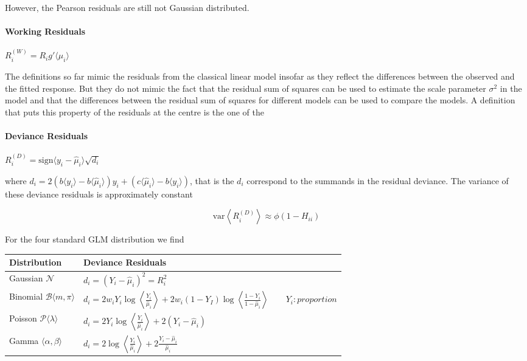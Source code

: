 \documentclass[11pt]{article}
\begin{document}
However, the Pearson residuals are still not Gaussian distributed.

\paragraph{Working Residuals} $R_i^{(W)} = R_i g'\langle \mu_i\rangle$

The definitions so far mimic the residuals from the classical linear model insofar as they reflect the differences between the observed and the fitted response. But they do not mimic the fact that the residual sum of squares can be used to estimate the scale parameter $\sigma^2$ in the model and that the differences between the residual sum of squares for different models can be used to compare the models. A definition that puts this property of the residuals at the centre is the one of the
\paragraph{Deviance Residuals} $R_i^{(D)} = \text{sign}\langle y_i - \widehat{\mu}_i \rangle \sqrt{d_i}$

where $d_i = 2\left(b\langle y_i \rangle - b\langle \widehat{\mu}_i \rangle \right) y_i + \left(c\langle \widehat{\mu}_i \rangle - b\langle y_i \rangle \right)$, that is the $d_i$ correspond to the summands in the residual deviance. The variance of these deviance residuals is approximately constant

\begin{equation*}
	\text{var}\left\langle R_i^{(D)} \right\rangle \approx \phi (1 - H_{ii})
\end{equation*}

\noindent
For the four standard GLM distribution we find

\vspace{1em}
\noindent
\begin{minipage}{\textwidth}
	\renewcommand{\arraystretch}{2}
	\centering
	\begin{tabularx}{\textwidth}{|p{4cm}|| X |}
		\hline
		\textbf{Distribution} & Deviance Residuals \\
		\hline
		Gaussian $\mathcal{N}$ & $d_i = \left( Y_i - \widehat{\mu}_i \right)^2 = R_i^2 $\\
		Binomial $\mathcal{B}\langle m, \pi \rangle$ & $ d_i = 2 w_i Y_i \log \left\langle \frac{Y_i}{\widehat{\mu}_i} \right\rangle + 2 w_i (1 - Y_I) \log\left\langle \frac{1 - Y_i}{1 - \widehat{\mu}_i} \right\rangle \qquad Y_i : proportion $ \\
		Poisson $\mathcal{P}\langle \lambda \rangle$ & $ d_i = 2 Y_i \log \left\langle \frac{Y_i}{\widehat{\mu}_i} \right\rangle + 2(Y_i - \widehat{\mu}_i)$ \\
		Gamma $ \langle \alpha, \beta \rangle $ & $ d_i = 2 \log\left\langle \frac{Y_i}{\widehat{\mu}_i} \right\rangle + 2\frac{Y_i - \widehat{\mu}_i}{\widehat{\mu}_i}$ \\
		\hline
	\end{tabularx}
\end{minipage}
\end{document}
